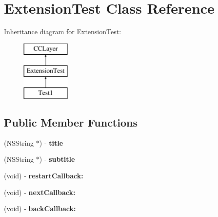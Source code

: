 \hypertarget{interface_extension_test}{\section{Extension\-Test Class Reference}
\label{interface_extension_test}
}
Inheritance diagram for Extension\-Test\-:\begin{figure}[H]
\begin{center}
\leavevmode
\includegraphics[height=3.000000cm]{interface_extension_test}
\end{center}
\end{figure}
\subsection*{Public Member Functions}
\begin{DoxyCompactItemize}
\item 
\hypertarget{interface_extension_test_a8f8d30b8bfdf52643473b02ec2a39b6a}{(N\-S\-String $\ast$) -\/ {\bfseries title}}\label{interface_extension_test_a8f8d30b8bfdf52643473b02ec2a39b6a}

\item 
\hypertarget{interface_extension_test_a3b7fb0bcc6709c7385bb6d76f61eded0}{(N\-S\-String $\ast$) -\/ {\bfseries subtitle}}\label{interface_extension_test_a3b7fb0bcc6709c7385bb6d76f61eded0}

\item 
\hypertarget{interface_extension_test_a073aac3ea4433d244512a986666ccb3c}{(void) -\/ {\bfseries restart\-Callback\-:}}\label{interface_extension_test_a073aac3ea4433d244512a986666ccb3c}

\item 
\hypertarget{interface_extension_test_a254bcbc056844e0a6f8e13a259dc605d}{(void) -\/ {\bfseries next\-Callback\-:}}\label{interface_extension_test_a254bcbc056844e0a6f8e13a259dc605d}

\item 
\hypertarget{interface_extension_test_a41dde2c4f2a205889719f2d2c69e41d0}{(void) -\/ {\bfseries back\-Callback\-:}}\label{interface_extension_test_a41dde2c4f2a205889719f2d2c69e41d0}

\end{DoxyCompactItemize}

